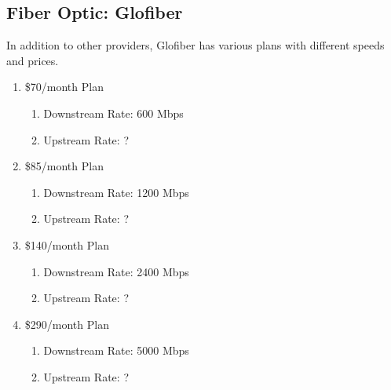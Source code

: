 \documentclass{article}
\begin{document}
\subsection{Fiber Optic: Glofiber}
In addition to other providers, Glofiber has various plans with different speeds and prices.
\begin{enumerate}
    \item \$70/month Plan \begin{enumerate}
        \item Downstream Rate: 600 Mbps
        \item Upstream Rate: ?
    \end{enumerate}
    \item \$85/month Plan \begin{enumerate}
        \item Downstream Rate: 1200 Mbps
        \item Upstream Rate: ?
    \end{enumerate}
    \item \$140/month Plan \begin{enumerate}
        \item Downstream Rate: 2400 Mbps
        \item Upstream Rate: ?
    \end{enumerate}
    \item \$290/month Plan \begin{enumerate}
        \item Downstream Rate: 5000 Mbps
        \item Upstream Rate: ?
    \end{enumerate}
\end{enumerate}
\end{document}

